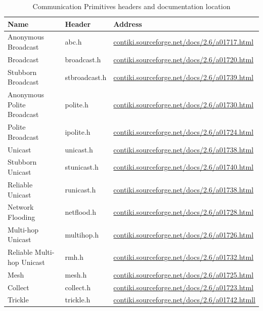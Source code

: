 \begin{table}[H]
	\centering
	\begin{tabular}{ | l | l | l | }
		\hline
		Name & Header & Address \\
		\hline
		Anonymous Broadcast & abc.h & \url{contiki.sourceforge.net/docs/2.6/a01717.html} \\
		Broadcast & broadcast.h & \url{contiki.sourceforge.net/docs/2.6/a01720.html} \\
		Stubborn Broadcast & stbroadcast.h & \url{contiki.sourceforge.net/docs/2.6/a01739.html} \\
		Anonymous Polite Broadcast & polite.h & \url{contiki.sourceforge.net/docs/2.6/a01730.html} \\
		Polite Broadcast & ipolite.h & \url{contiki.sourceforge.net/docs/2.6/a01724.html} \\
		Unicast & unicast.h & \url{contiki.sourceforge.net/docs/2.6/a01738.html} \\
		Stubborn Unicast & stunicast.h & \url{contiki.sourceforge.net/docs/2.6/a01740.html} \\
		Reliable Unicast & runicast.h & \url{contiki.sourceforge.net/docs/2.6/a01738.html} \\
		Network Flooding & netflood.h & \url{contiki.sourceforge.net/docs/2.6/a01728.html} \\
		Multi-hop Unicast & multihop.h & \url{contiki.sourceforge.net/docs/2.6/a01726.html} \\
		Reliable Multi-hop Unicast & rmh.h & \url{contiki.sourceforge.net/docs/2.6/a01732.html} \\
		\hline
		\hline
		Mesh & mesh.h & \url{contiki.sourceforge.net/docs/2.6/a01725.html} \\
		Collect & collect.h & \url{contiki.sourceforge.net/docs/2.6/a01723.html} \\
		Trickle & trickle.h & \url{contiki.sourceforge.net/docs/2.6/a01742.htmll} \\
		\hline
	\end{tabular}
	\caption{Communication Primitives headers and documentation location}
\end{table}


